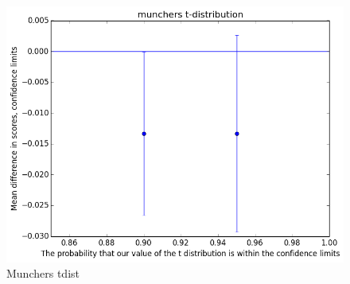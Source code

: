 			\begin{figure}[] 
				\centering 
				\includegraphics[width=\textwidth]{munchers_tdist.png} 
				\caption{Munchers tdist}
			\end{figure}

